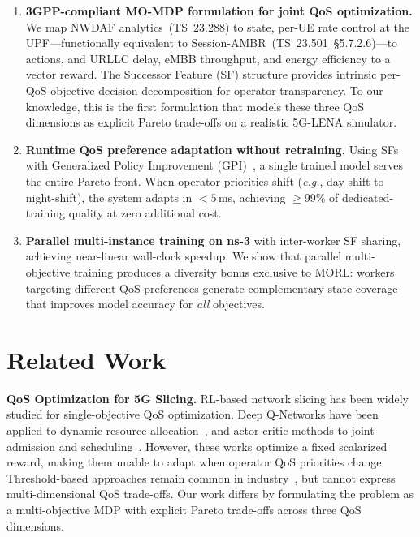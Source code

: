 \documentclass[conference]{IEEEtran}
\newcommand{\eg}{\textit{e.g.}}
\begin{document}
\begin{enumerate}
\item \textbf{3GPP-compliant MO-MDP formulation for joint QoS optimization.}
We map NWDAF analytics~(TS~23.288) to state, per-UE rate control at the UPF---functionally equivalent to Session-AMBR~(TS~23.501~\S5.7.2.6)---to actions, and URLLC delay, eMBB throughput, and energy efficiency to a vector reward.
The Successor Feature (SF) structure provides intrinsic per-QoS-objective decision decomposition for operator transparency.
To our knowledge, this is the first formulation that models these three QoS dimensions as explicit Pareto trade-offs on a realistic 5G-LENA simulator.

\item \textbf{Runtime QoS preference adaptation without retraining.}
Using SFs with Generalized Policy Improvement (GPI)~\cite{barreto2017,gpipd}, a single trained model serves the entire Pareto front.
When operator priorities shift (\eg, day-shift to night-shift), the system adapts in ${<}5$\,ms, achieving ${\geq}$99\% of dedicated-training quality at zero additional cost.

\item \textbf{Parallel multi-instance training on ns-3} with inter-worker SF sharing, achieving near-linear wall-clock speedup.
We show that parallel multi-objective training produces a diversity bonus exclusive to MORL: workers targeting different QoS preferences generate complementary state coverage that improves model accuracy for \emph{all} objectives.
\end{enumerate}

\section{Related Work}\label{sec:related}

\textbf{QoS Optimization for 5G Slicing.}
RL-based network slicing has been widely studied for single-objective QoS optimization.
Deep Q-Networks have been applied to dynamic resource allocation~\cite{slicingrl1}, and actor-critic methods to joint admission and scheduling~\cite{slicingrl2}.
However, these works optimize a fixed scalarized reward, making them unable to adapt when operator QoS priorities change.
Threshold-based approaches remain common in industry~\cite{ts23503}, but cannot express multi-dimensional QoS trade-offs.
Our work differs by formulating the problem as a multi-objective MDP with explicit Pareto trade-offs across three QoS dimensions.
\end{document}
